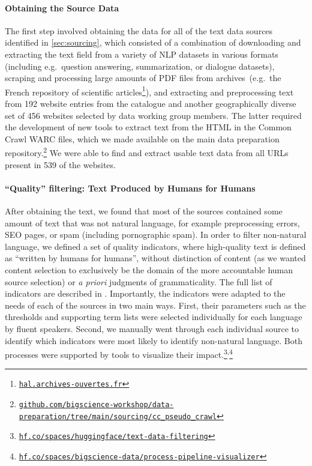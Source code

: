 \paragraph{Obtaining the Source Data} The first step involved obtaining the data for all of the text data sources identified in \ref{sec:sourcing}, which consisted of a combination of downloading and extracting the text field from a variety of NLP datasets in various formats (including e.g.\ question answering, summarization, or dialogue datasets), scraping and processing large amounts of PDF files from archives~(e.g.\ the French repository of scientific articles\footnote{\href{https://hal.archives-ouvertes.fr/}{\texttt{hal.archives-ouvertes.fr}}}), and extracting and preprocessing text from 192 website entries from the catalogue and another geographically diverse set of 456 websites selected by data working group members. The latter required the development of new tools to extract text from the HTML in the Common Crawl WARC files, which we made available on the main data preparation repository.\footnote{ \href{https://github.com/bigscience-workshop/data-preparation/tree/main/sourcing/cc_pseudo_crawl}{\texttt{github.com/bigscience-workshop/data-preparation/tree/main/sourcing/cc\_pseudo\_crawl}}} We were able to find and extract usable text data from all URLs present in 539 of the websites.

\paragraph{``Quality'' filtering: Text Produced by Humans for Humans} After obtaining the text, we found that most of the sources contained some amount of text that was not natural language, for example preprocessing errors, SEO pages, or spam (including pornographic spam). In order to filter non-natural language, we defined a set of quality indicators, where high-quality text is defined as ``written by humans for humans'', without distinction of content (as we wanted content selection to exclusively be the domain of the more accountable human source selection) or \textit{a priori} judgments of grammaticality. The full list of indicators are described in  \citep{laurencon2022bigscience}. Importantly, the indicators were adapted to the needs of each of the sources in two main ways. First, their parameters such as the thresholds and supporting term lists were selected individually for each language by fluent speakers. Second, we manually went through each individual source to identify which indicators were most likely to identify non-natural language. Both processes were supported by tools to visualize their impact.\footnote{\href{https://hf.co/spaces/huggingface/text-data-filtering}{\texttt{hf.co/spaces/huggingface/text-data-filtering}}}\textsuperscript{,}\footnote{\href{https://hf.co/spaces/bigscience-data/process-pipeline-visualizer}{\texttt{hf.co/spaces/bigscience-data/process-pipeline-visualizer}}}

